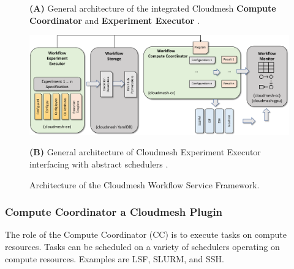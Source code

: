 \documentclass[utf8]{FrontiersinVancouver} %
\begin{document}
\begin{figure}[htb]
{    {\bf (A)} General architecture of the integrated Cloudmesh {\bf Compute Coordinator} and {\bf Experiment Executor} \citep{las-frontiers-edu}.

\bigskip\bigskip
    
    \centering\includegraphics[width=1.0\columnwidth]{images/cloudmesh-ee-new}
    
    
    {\bf (B)} General architecture of Cloudmesh Experiment Executor interfacing with abstract schedulers \citep{las-frontiers-edu}.
  }

  
  
    \caption{Architecture of the Cloudmesh Workflow Service Framework.}
    \label{fig:cc-2}

\end{figure}


 
\subsubsection{Compute Coordinator a Cloudmesh Plugin}
\label{sec:workflow-cc}

The role of the Compute Coordinator (CC) is to execute tasks on compute resources. Tasks can be scheduled on a variety of schedulers operating on compute resources. Examples are LSF, SLURM, and SSH.
\end{document}
